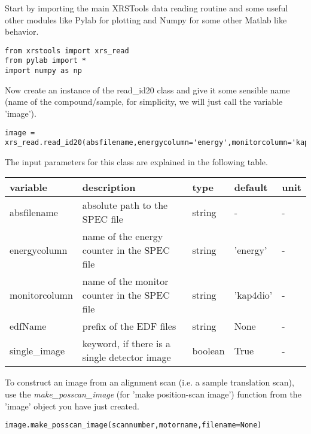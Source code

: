 \documentclass[aps,prl,groupedaddress]{revtex4}
\begin{document}
Start by importing the main XRSTools data reading routine and some useful other modules like Pylab for plotting and Numpy for some other Matlab like behavior.
\lstset{language=Python, breaklines=true}
\begin{lstlisting}[frame=single]
from xrstools import xrs_read
from pylab import *
import numpy as np
\end{lstlisting}

Now create an instance of the read\_id20 class and give it some sensible name (name of the compound/sample, for simplicity, we will just call the variable 'image').
\begin{lstlisting}[frame=single]
image = xrs_read.read_id20(absfilename,energycolumn='energy',monitorcolumn='kap4dio',edfName=None,single_image=True)
\end{lstlisting}

The input parameters for this class are explained in the following table.

\begin{ruledtabular}
\begin{tabular}{lllll}
variable       & description                                        & type     & default     & unit  \\
\hline
absfilename    & absolute path to the SPEC file                     & string   & -           & -    \\
energycolumn   & name of the energy counter in the SPEC file        & string   & 'energy'    & -    \\
monitorcolumn  & name of the monitor counter in the SPEC file       & string   & 'kap4dio'   & -    \\
edfName        & prefix of the EDF files                            & string   & None        & -    \\
single\_image  & keyword, if there is a single detector image       & boolean  & True        & -    \\
\end{tabular}
\end{ruledtabular}

To construct an image from an alignment scan (i.e. a sample translation scan), use the \textit{make\_posscan\_image} (for 'make position-scan image') function from the 'image' object you have just created.
\begin{lstlisting}[frame=single]
image.make_posscan_image(scannumber,motorname,filename=None)
\end{lstlisting}
\end{document}
